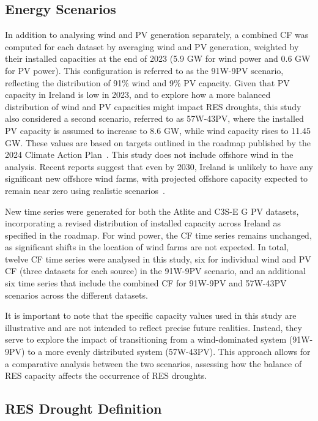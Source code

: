 \documentclass[preprint, 12pt]{elsarticle}
\begin{document}
\subsection{Energy Scenarios}
\label{sec:scenarios}

In addition to analysing wind and PV generation separately, a combined CF was computed for each dataset by averaging wind and PV generation, weighted by their installed capacities at the end of 2023 (5.9 GW for wind power and 0.6 GW for PV power). This configuration is referred to as the 91W-9PV scenario, reflecting the distribution of 91\% wind and 9\% PV capacity. Given that PV capacity in Ireland is low in 2023, and to explore how a more balanced distribution of wind and PV capacities might impact RES droughts, this study also considered a second scenario, referred to as 57W-43PV, where the installed PV capacity is assumed to increase to 8.6 GW, while wind capacity rises to 11.45 GW. These values are based on targets outlined in the roadmap published by the 2024 Climate Action Plan~\citep{cap2024future}. This study does not include offshore wind in the analysis. Recent reports suggest that even by 2030, Ireland is unlikely to have any significant new offshore wind farms, with projected offshore capacity expected to remain near zero using realistic scenarios~\citep{seai2024future}.

New time series were generated for both the Atlite and C3S-E G PV datasets, incorporating a revised distribution of installed capacity across Ireland as specified in the roadmap. For wind power, the CF time series remains unchanged, as significant shifts in the location of wind farms are not expected. In total, twelve CF time series were analysed in this study, six for individual wind and PV CF (three datasets for each source) in the 91W-9PV scenario, and an additional six time series that include the combined CF for 91W-9PV and 57W-43PV scenarios across the different datasets.

It is important to note that the specific capacity values used in this study are illustrative and are not intended to reflect precise future realities. Instead, they serve to explore the impact of transitioning from a wind-dominated system (91W-9PV) to a more evenly distributed system (57W-43PV). This approach allows for a comparative analysis between the two scenarios, assessing how the balance of RES capacity affects the occurrence of RES droughts.

\subsection{RES Drought Definition}
\label{sec:res_drought}
\end{document}
